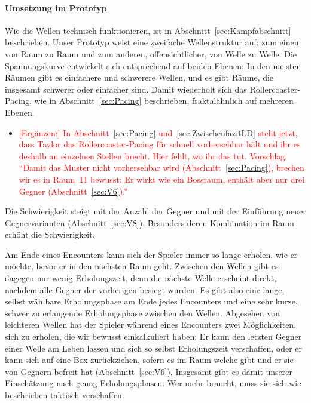 \documentclass[../Main.tex]{subfiles}
\begin{document}
\paragraph{Umsetzung im Prototyp}
Wie die Wellen technisch funktionieren, ist in Abschnitt~\ref{sec:Kampfabschnitt} beschrieben. Unser Prototyp weist eine zweifache Wellenstruktur auf: zum einen von Raum zu Raum und zum anderen, offensichtlicher, von Welle zu Welle. Die Spannungskurve entwickelt sich entsprechend auf beiden Ebenen: In den meisten Räumen gibt es einfachere und schwerere Wellen, und es gibt Räume, die insgesamt schwerer oder einfacher sind. Damit wiederholt sich das Rollercoaster-Pacing, wie in Abschnitt~\ref{sec:Pacing} beschrieben, fraktalähnlich auf mehreren Ebenen.

\begin{itemize}[leftmargin=1.5cm]
    \item \textcolor{red}{[Ergänzen:] In Abschnitt~\ref{sec:Pacing} und~\ref{sec:ZwischenfazitLD} steht jetzt, dass Taylor das Rollercoaster-Pacing für schnell vorhersehbar hält und ihr es deshalb an einzelnen Stellen brecht. Hier fehlt, wo ihr das tut. Vorschlag: \enquote{Damit das Muster nicht vorhersehbar wird (Abschnitt~\ref{sec:Pacing}), brechen wir es in Raum~11 bewusst: Er wirkt wie ein Bossraum, enthält aber nur drei Gegner (Abschnitt~\ref{sec:V6}).}}
\end{itemize}

Die Schwierigkeit steigt mit der Anzahl der Gegner und mit der Einführung neuer Gegnervarianten (Abschnitt~\ref{sec:V8}). Besonders deren Kombination im Raum erhöht die Schwierigkeit.

Am Ende eines Encounters kann sich der Spieler immer so lange erholen, wie er möchte, bevor er in den nächsten Raum geht. Zwischen den Wellen gibt es dagegen nur wenig Erholungszeit, denn die nächste Welle erscheint direkt, nachdem alle Gegner der vorherigen besiegt wurden. Es gibt also eine lange, selbst wählbare Erholungsphase am Ende jedes Encounters und eine sehr kurze, schwer zu erlangende Erholungsphase zwischen den Wellen. Abgesehen von leichteren Wellen hat der Spieler während eines Encounters zwei Möglichkeiten, sich zu erholen, die wir bewusst einkalkuliert haben: Er kann den letzten Gegner einer Welle am Leben lassen und sich so selbst Erholungszeit verschaffen, oder er kann sich auf eine Box zurückziehen, sofern es im Raum welche gibt und er sie von Gegnern befreit hat (Abschnitt~\ref{sec:V6}). Insgesamt gibt es damit unserer Einschätzung nach genug Erholungsphasen. Wer mehr braucht, muss sie sich wie beschrieben taktisch verschaffen.
\end{document}
